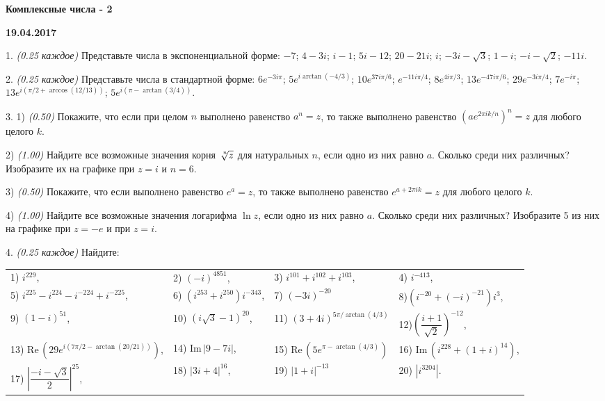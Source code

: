 \documentclass[14pt]{article}
\begin{document}
\begin{center}
\Large{\textbf{Комплексные числа - 2}}

\textbf{19.04.2017}
\vspace{5mm}
\end{center}

1. \textit{(0.25 каждое)} Представьте числа в экспоненциальной форме: $-7$; $4-3i$; $i-1$; $5i-12$; $20-21i$; $i$; $-3i-\sqrt3$; $1-i$; $-i-\sqrt2$; $-11i$.

2. \textit{(0.25 каждое)} Представьте числа в стандартной форме: $6e^{-3i\pi}$; $5e^{i\arctan(-4/3)}$; $10e^{37i\pi/6}$; $e^{-11i\pi/4}$; $8e^{4i\pi/3}$; $13e^{-47i\pi/6}$; $29e^{-3i\pi/4}$; $7e^{-i\pi}$; $13e^{i(\pi/2+\arccos(12/13))}$; $5e^{i(\pi-\arctan(3/4))}$.

3. 1) \textit{(0.50)} Покажите, что если при целом $n$ выполнено равенство $a^n=z$, то также выполнено равенство $\left(ae^{2\pi ik/n}\right)^n=z$ для любого целого $k$.

2) \textit{(1.00)} Найдите все возможные значения корня $\sqrt[\leftroot{-2}\uproot{2}n]{z}$ для натуральных $n$, если одно из них равно $a$. Сколько среди них различных? Изобразите их на графике при $z=i$ и $n=6$.

3) \textit{(0.50)} Покажите, что если выполнено равенство $e^a=z$, то также выполнено равенство $e^{a+2\pi ik}=z$ для любого целого $k$.

4) \textit{(1.00)} Найдите все возможные значения логарифма $\ln z$, если одно из них равно $a$. Сколько среди них различных? Изобразите 5 из них на графике при $z=-e$ и при $z=i$.

4. \textit{(0.25 каждое)} Найдите:

\begin{tabular}{llll}
1) $i^{229}$, \hspace{1.5cm} & 2) $(-i)^{4851}$, \hspace{1.5cm} & 3) $i^{101}+i^{102}+i^{103}$, \hspace{1.2cm} & 4) $i^{-413}$,\\
5) $i^{225}-i^{224}-i^{-224}+i^{-225}$, & 6) $(i^{253}+i^{250})i^{-343}$, & 7) $(-3i)^{-20}$ & 8)$(i^{-20}+(-i)^{-21})i^3$,\\
9) $(1-i)^{51}$, & 10) $(i\sqrt3-1)^{20}$, & 11) $(3+4i)^{5\pi/\arctan(4/3)}$ & 12)$\left(\dfrac{i+1}{\sqrt2}\right)^{-12}$,\\
13) $\text{Re}\,(29e^{i(7\pi/2-\arctan(20/21))})$, & 14) $\text{Im}\,|9-7i|$, & 15) $\text{Re}\,(5e^{\pi-\arctan(4/3)})$ & 16) $\text{Im}\,(i^{228}+(1+i)^{14})$,\\
17) $\left|\dfrac{-i-\sqrt3}{2}\right|^{25}$, & 18) $\left|3i+4\right|^{16}$, & 19) $\left|1+i\right|^{-13}$ & 20) $\left|i^{3204}\right|$.
\end{tabular}
\end{document}
